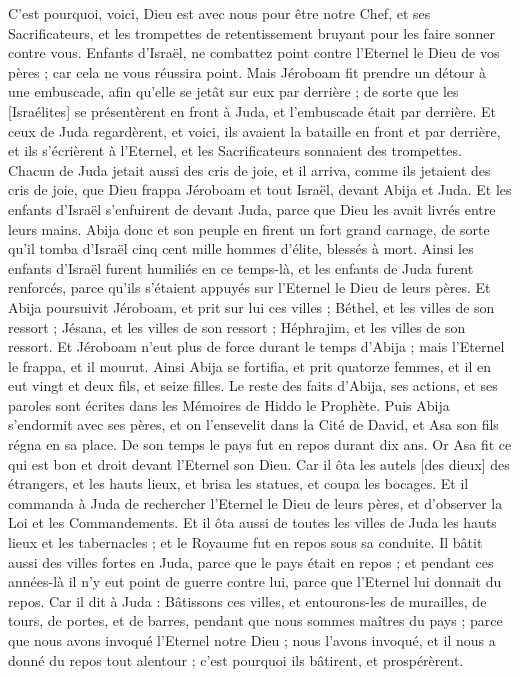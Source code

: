\begin{multicols}{2}
C'est pourquoi, voici, Dieu est avec nous pour être notre Chef, et ses Sacrificateurs, et les trompettes de retentissement bruyant pour les faire sonner contre vous. Enfants d'Israël, ne combattez point contre l'Eternel le Dieu de vos pères ; car cela ne vous réussira point.
Mais Jéroboam fit prendre un détour à une embuscade, afin qu'elle se jetât sur eux par derrière ; de sorte que les [Israélites] se présentèrent en front à Juda, et l'embuscade était par derrière.
Et ceux de Juda regardèrent, et voici, ils avaient la bataille en front et par derrière, et ils s'écrièrent à l'Eternel, et les Sacrificateurs sonnaient des trompettes.
Chacun de Juda jetait aussi des cris de joie, et il arriva, comme ils jetaient des cris de joie, que Dieu frappa Jéroboam et tout Israël, devant Abija et Juda.
Et les enfants d'Israël s'enfuirent de devant Juda, parce que Dieu les avait livrés entre leurs mains.
Abija donc et son peuple en firent un fort grand carnage, de sorte qu'il tomba d'Israël cinq cent mille hommes d'élite, blessés à mort.
Ainsi les enfants d'Israël furent humiliés en ce temps-là, et les enfants de Juda furent renforcés, parce qu'ils s'étaient appuyés sur l'Eternel le Dieu de leurs pères.
Et Abija poursuivit Jéroboam, et prit sur lui ces villes ; Béthel, et les villes de son ressort ; Jésana, et les villes de son ressort ; Héphrajim, et les villes de son ressort.
Et Jéroboam n'eut plus de force durant le temps d'Abija ; mais l'Eternel le frappa, et il mourut.
Ainsi Abija se fortifia, et prit quatorze femmes, et il en eut vingt et deux fils, et seize filles.
Le reste des faits d'Abija, ses actions, et ses paroles sont écrites dans les Mémoires de Hiddo le Prophète.
\VerseOne{}Puis Abija s'endormit avec ses pères, et on l'ensevelit dans la Cité de David, et Asa son fils régna en sa place. De son temps le pays fut en repos durant dix ans.
Or Asa fit ce qui est bon et droit devant l'Eternel son Dieu.
Car il ôta les autels [des dieux] des étrangers, et les hauts lieux, et brisa les statues, et coupa les bocages.
Et il commanda à Juda de rechercher l'Eternel le Dieu de leurs pères, et d'observer la Loi et les Commandements.
Et il ôta aussi de toutes les villes de Juda les hauts lieux et les tabernacles ; et le Royaume fut en repos sous sa conduite.
Il bâtit aussi des villes fortes en Juda, parce que le pays était en repos ; et pendant ces années-là il n'y eut point de guerre contre lui, parce que l'Eternel lui donnait du repos.
Car il dit à Juda : Bâtissons ces villes, et entourons-les de murailles, de tours, de portes, et de barres, pendant que nous sommes maîtres du pays ; parce que nous avons invoqué l'Eternel notre Dieu ; nous l'avons invoqué, et il nous a donné du repos tout alentour ; c'est pourquoi ils bâtirent, et prospérèrent.

\end{multicols}
